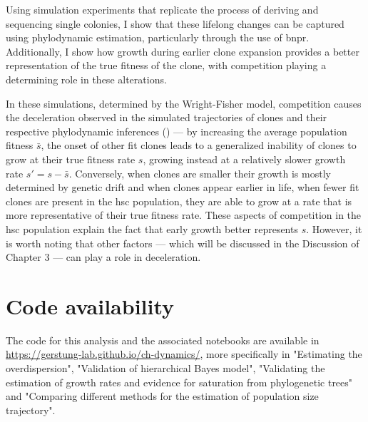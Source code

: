 Using simulation experiments that replicate the process of deriving and sequencing single colonies, I show that these lifelong changes can be captured using phylodynamic estimation, particularly through the use of \ac{bnpr}. Additionally, I show how growth during earlier clone expansion provides a better representation of the true fitness of the clone, with competition playing a determining role in these alterations.

In these simulations, determined by the Wright-Fisher model, competition causes the deceleration observed in the simulated trajectories of clones and their respective phylodynamic inferences () --- by increasing the average population fitness $\bar{s}$, the onset of other fit clones leads to a generalized inability of clones to grow at their true fitness rate $s$, growing instead at a relatively slower growth rate $s' = s - \bar{s}$. Conversely, when clones are smaller their growth is mostly determined by genetic drift and when clones appear earlier in life, when fewer fit clones are present in the \ac{hsc} population, they are able to grow at a rate that is more representative of their true fitness rate. These aspects of competition in the \ac{hsc} population explain the fact that early growth better represents $s$. However, it is worth noting that other factors --- which will be discussed in the Discussion of Chapter 3 --- can play a role in deceleration. 

\section{Code availability}

The code for this analysis and the associated notebooks are available in \url{https://gerstung-lab.github.io/ch-dynamics/}, more specifically in "Estimating the overdispersion", "Validation of hierarchical Bayes model", "Validating the estimation of growth rates and evidence for saturation from phylogenetic trees" and "Comparing different methods for the estimation of population size trajectory".